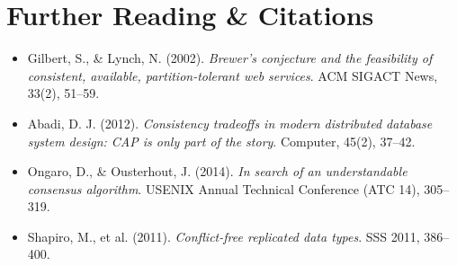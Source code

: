 \section{Further Reading \protect\& Citations}
\begin{itemize}[leftmargin=18pt]
  \item Gilbert, S., \& Lynch, N. (2002). \emph{Brewer's conjecture and the feasibility of consistent, available, partition-tolerant web services}. ACM SIGACT News, 33(2), 51--59.
  \item Abadi, D. J. (2012). \emph{Consistency tradeoffs in modern distributed database system design: CAP is only part of the story}. Computer, 45(2), 37--42.
  \item Ongaro, D., \& Ousterhout, J. (2014). \emph{In search of an understandable consensus algorithm}. USENIX Annual Technical Conference (ATC 14), 305--319.
  \item Shapiro, M., et al. (2011). \emph{Conflict-free replicated data types}. SSS 2011, 386--400.
\end{itemize}
